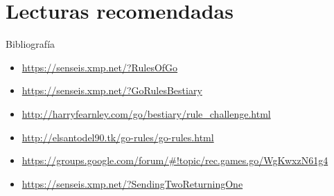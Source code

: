 \documentclass{beamer}
\begin{document}
\section{Lecturas recomendadas}

\begin{frame}{Bibliografía}

    \begin{itemize}
        \item \url{https://senseis.xmp.net/?RulesOfGo}
        \item \url{https://senseis.xmp.net/?GoRulesBestiary}
        \item \url{http://harryfearnley.com/go/bestiary/rule_challenge.html}
        \item \url{http://elsantodel90.tk/go-rules/go-rules.html}
        \item \url{https://groups.google.com/forum/\#!topic/rec.games.go/WgKwxzN61g4}
        \item \url{https://senseis.xmp.net/?SendingTwoReturningOne}
    \end{itemize}

\end{frame}
\end{document}
